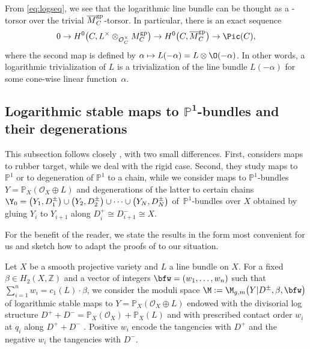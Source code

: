 From \eqref{eq:logseq}, we see that the logarithmic line bundle  can be thought as a -torsor over the trivial $\overline{M}_C^{\rm gp}$-torsor.
In particular, there is an exact sequence
\[0\to H^0\bigl(C,L^{\times}\otimes_{\mathcal O_C^{\times}}M_C^{\rm gp}\bigr)\to H^0\bigl(C, \overline{M}_C^{\rm gp}\bigr)\to\Pic(C),
 \]
where the second map is defined by
$\alpha\mapsto L(-\alpha)=L\otimes\O(-\alpha)$.
In other words, a logarithmic trivialization of $L$ is a trivialization of the line bundle $L(-\alpha)$ for some cone-wise linear function~$\alpha$.

\subsection[Logarithmic stable maps to P\^{}1-bundles and their degenerations]{Logarithmic stable maps to $\boldsymbol{\mathbb P^1}$-bundles and their degenerations}

This subsection follows closely \cite[Section~5]{marcuswiselog}, with two small differences. First, \cite{marcuswiselog} considers maps to rubber target, while we deal with the rigid case. Second, they study maps to $\mathbb{P}^1$ or to degeneration of $\mathbb P^1$ to a chain, while we consider maps to $\mathbb{P}^1$-bundles $Y=\mathbb P_X(\mathcal O_X\oplus L)$ and degenerations of the latter to certain chains $\Y_0=\bigl(Y_1,D_1^\pm\bigr)\cup \bigl(Y_2,D_2^\pm\bigr)\cup\dots\cup\bigl(Y_N,D_N^\pm\bigr)$ of~$\mathbb{P}^1$-bundles over $X$ obtained by gluing $Y_i$ to $Y_{i+1}$ along $D_i^+\cong D_{i+1}^-\cong X$.

For the benefit of the reader, we state the results in the form most convenient for us and sketch how to adapt the proofs of \cite[Section~5]{marcuswiselog} to our situation.

Let $X$ be a smooth projective variety and $L$ a line bundle on $X$.
For a fixed $\beta\in H_2(X,\mathbb Z)$ and a vector of integers $\bfw=(w_1,\dots,w_n)$ such that $\sum_{i=1}^n w_i=c_1(L)\cdot\beta$, we consider the moduli space
$\M := \M_{g,m}\bigl(Y|D^{\pm},\beta,\bfw\bigr)$
of logarithmic stable maps to $Y=\mathbb P_X(\mathcal O_X\oplus L)$ endowed with the divisorial log structure $D^++D^-=\mathbb P_X(\mathcal O_X) +\mathbb P_X(L)$ and with prescribed contact order $w_i$ at $q_i$ along $D^++D^-$ \cite{abramovich2014stable,gross2013logarithmic}.
Positive $w_i$ encode the tangencies with $D^+$ and the negative $w_i$ the tangencies with $D^-$.


